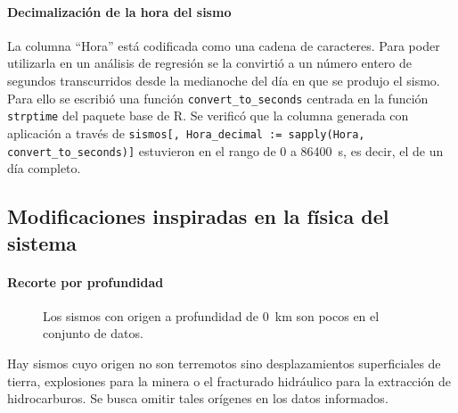 \documentclass[a4paper]{report}
\begin{document}


\paragraph{Decimalización de la hora del sismo}
La columna ``Hora'' está codificada como una cadena de caracteres.
Para poder utilizarla en un análisis de regresión se la convirtió a un número entero de segundos transcurridos desde la medianoche del día en que se produjo el sismo. 
Para ello se escribió una función \verb'convert_to_seconds' centrada en la función \verb'strptime' del paquete base de R.
Se verificó que la columna generada con aplicación a través de \verb'sismos[, Hora_decimal := sapply(Hora, convert_to_seconds)]' estuvieron en el rango de \num{0} a \SI{86400}{\second}, es decir, el de un día completo.


\subsection{Modificaciones inspiradas en la física del sistema}


\paragraph{Recorte por profundidad}

\begin{figure}
	\centering
	
	\caption{Los sismos con origen a profundidad de \SI{0}{km} son pocos en el conjunto de datos.}
	\label{fig:histograma_profundidad}
\end{figure}
Hay sismos cuyo origen no son terremotos sino desplazamientos superficiales de tierra, explosiones para la minera o el fracturado hidráulico para la extracción de hidrocarburos.
Se busca omitir tales orígenes en los datos informados.
\end{document}
